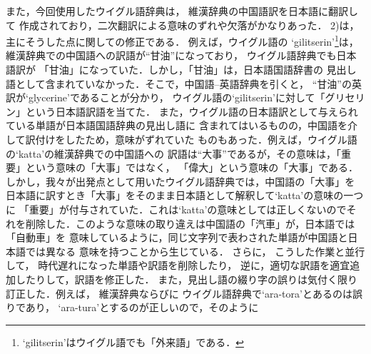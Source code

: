 また，今回使用したウイグル語辞典\cite{UJDIC}は，
維漢辞典\cite{UHDIC}の中国語訳を日本語に翻訳して
作成されており，二次翻訳による意味のずれや欠落がかなりあった．
2)は，主にそうした点に関しての修正である．
例えば，ウイグル語の
`gilitserin'\footnote{`gilitserin'はウイグル語でも「外来語」である．}は，
維漢辞典\cite{UHDIC}での中国語への訳語が``甘油''になっており，
ウイグル語辞典\cite{UJDIC}でも日本語訳が
「甘油」になっていた．しかし，「甘油」は，日本語国語辞書の
見出し語として含まれていなかった．そこで，中国語--英語辞典\cite{EC_CE_DIC}を引くと，
``甘油''の英訳が`glycerine'であることが分かり，
ウイグル語の`gilitserin'に対して「グリセリン」という日本語訳語を当てた．
また，ウイグル語の日本語訳として与えられている単語が日本語国語辞典の見出し語に
含まれてはいるものの，中国語を介して訳付けをしたため，意味がずれていた
ものもあった．例えば，ウイグル語の`katta'の維漢辞典\cite{UHDIC}での中国語への
訳語は``大事''であるが，その意味は，「重要」という意味の「大事」ではなく，
「偉大」という意味の「大事」である．
しかし，我々が出発点として用いたウイグル語辞典\cite{UJDIC}では，中国語の「大事」を
日本語に訳すとき「大事」をそのまま日本語として解釈して`katta'の意味の一つに
「重要」が付与されていた．これは`katta'の意味としては正しくないのでそれを削除した．このような意味の取り違えは中国語の「汽車」が，日本語では「自動車」を
意味しているように，同じ文字列で表わされた単語が中国語と日本語では異なる
意味を持つことから生じている．
さらに，
こうした作業と並行して，
時代遅れになった単語や訳語を削除したり，
逆に，適切な訳語を適宜追加したりして，訳語を修正した．
また，見出し語の綴り字の誤りは気付く限り訂正した．例えば，
維漢辞典\cite{UHDIC}ならびに
ウイグル語辞典\cite{UJDIC}で`ara-tora'とあるのは誤りであり，
`ara-tura'とするのが正しいので，そのように
